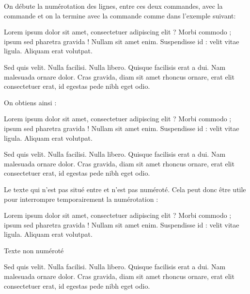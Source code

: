 On débute la numérotation des lignes, entre ces deux commandes, avec la commande  et on la termine avec la commande  comme dans l'exemple suivant:

\begin{latexcode}
\beginnumbering
\pstart %
Lorem ipsum dolor sit amet, consectetuer adipiscing elit ?
Morbi commodo ; ipsum sed pharetra gravida !
Nullam sit amet enim. Suspendisse id : velit vitae ligula.
Aliquam erat volutpat.

Sed quis velit. Nulla facilisi. Nulla libero. 
Quisque facilisis erat a dui. 
Nam malesuada ornare dolor.
Cras gravida, diam sit amet rhoncus ornare, 
erat  elit consectetuer erat, id egestas pede nibh eget odio.
\pend %
\endnumbering
\end{latexcode}

On obtiens ainsi : 

\begin{minipage}{0.8\textwidth}
\beginnumbering
\pstart %
Lorem ipsum dolor sit amet, consectetuer adipiscing elit ?
Morbi commodo ; ipsum sed pharetra gravida !
Nullam sit amet enim. Suspendisse id : velit vitae ligula. 
Aliquam erat volutpat.


Sed quis velit. Nulla facilisi. Nulla libero. 
 Quisque facilisis erat a dui. %
Nam malesuada ornare dolor.
Cras gravida, diam sit amet rhoncus ornare, 
erat  elit consectetuer erat, id egestas pede nibh eget odio.
\pend
\endnumbering
\end{minipage}



Le texte qui n'est pas situé entre  et  n'est pas numéroté. Cela peut donc être utile pour interrompre temporairement la numérotation :

\begin{latexcode}
\beginnumbering
\pstart %
Lorem ipsum dolor sit amet, consectetuer adipiscing elit ?
Morbi commodo ; ipsum sed pharetra gravida !
Nullam sit amet enim. Suspendisse id : velit vitae ligula.
Aliquam erat volutpat.
\pend

Texte non numéroté

\pstart Sed quis velit. Nulla facilisi. Nulla libero. 
Quisque facilisis erat a dui. 
Nam malesuada ornare dolor.
Cras gravida, diam sit amet rhoncus ornare, 
erat  elit consectetuer erat, id egestas pede nibh eget odio.
\pend %
\endnumbering
\end{latexcode}

